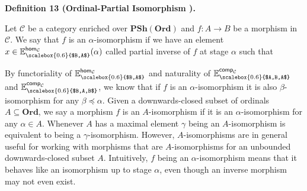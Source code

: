  
 
\par\medskip\noindent\textbf{Definition 13 (Ordinal-Partial Isomorphism ).}\par
 
 
Let $\mathcal{C}$ be a category enriched over $\mathbf{PSh}(\mathbf{Ord})$ and $f:A\to B$ be a morphism in $\mathcal{C}$. We say that $f$ is an $\alpha$-isomorphism if we have an element $x\in\mathbb{E}^{\mathsf{hom}_{\mathcal{C}}}_{\scalebox{0.6}{$B,A$}}(\alpha)$ called partial inverse of $f$ at stage $\alpha$ such that\par
 
\begin{center}\end{center}
 
 
 
 
By functoriality of $\mathbb{E}^{\mathsf{hom}_{\mathcal{C}}}_{\scalebox{0.6}{$B,A$}}$ and naturality of $\mathbb{E}^{\mathsf{comp}_{\mathcal{C}}}_{\scalebox{0.6}{$A,B,A$}}$ and $\mathbb{E}^{\mathsf{comp}_{\mathcal{C}}}_{\scalebox{0.6}{$B,A,B$}}$, we know that if $f$ is an $\alpha$-isomorphism it is also $\beta$-isomorphism for any $\beta\preceq\alpha$. Given a downwards-closed subset of ordinals $A\subseteq\mathbf{Ord}$, we say a morphism $f$ is an $A$-isomorphism if it is an $\alpha$-isomorphism for any $\alpha\in A$. Whenever $A$ has a maximal element $\gamma$ being an $A$-isomorphism is equivalent to being a $\gamma$-isomorphism. However, $A$-isomorphisms are in general useful for working with morphisms that are $A$-isomorphisms for an unbounded downwards-closed subset $A$. Intuitively, $f$ being an $\alpha$-isomorphism means that it behaves like an isomorphism up to stage $\alpha$, even though an inverse morphism may not even exist.\par
 

